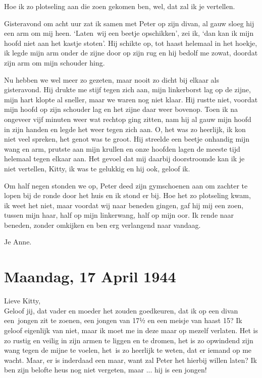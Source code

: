 \documentclass{book}
\begin{document}
Hoe ik zo plotseling aan die zoen gekomen ben, wel, dat zal ik je
vertellen.

Gisteravond om acht uur zat ik samen met Peter op zijn divan, al gauw
sloeg hij een arm om mij heen. `Laten~wij een beetje opschikken', zei
ik, `dan kan ik mijn hoofd niet aan het kastje stoten'. Hij schikte op,
tot haast helemaal in het hoekje, ik legde mijn arm onder de zijne door
op zijn rug en hij bedolf me zowat, doordat zijn arm om mijn schouder
hing.

Nu hebben we wel meer zo gezeten, maar nooit zo dicht bij elkaar als
gisteravond. Hij drukte me stijf tegen zich aan, mijn linkerborst lag op
de zijne, mijn hart klopte al sneller, maar we waren nog niet klaar. Hij
rustte niet, voordat mijn hoofd op zijn schouder lag en het zijne daar
weer bovenop. Toen ik na ongeveer vijf minuten weer wat rechtop ging
zitten, nam hij al gauw mijn hoofd in zijn handen en legde het weer
tegen zich aan. O, het was zo heerlijk, ik kon niet veel spreken, het
genot was te groot. Hij streelde een beetje onhandig mijn wang en arm,
prutste aan mijn krullen en onze hoofden lagen de meeste tijd helemaal
tegen elkaar aan. Het gevoel dat mij daarbij doorstroomde kan ik je niet
vertellen, Kitty, ik was te gelukkig en hij ook, geloof ik.

Om half negen stonden we op, Peter deed zijn gymschoenen aan om zachter
te lopen bij de ronde door het huis en ik stond er bij. Hoe het zo
plotseling kwam, ik weet het niet, maar voordat wij naar beneden gingen,
gaf hij mij een zoen, tussen mijn haar, half op mijn linkerwang, half op
mijn oor. Ik rende naar beneden, zonder omkijken en ben erg verlangend
naar vandaag.

Je Anne.

\chapter{Maandag, 17 April 1944}

Lieve Kitty,\\Geloof jij, dat vader en moeder het zouden goedkeuren, dat
ik op een divan een~jongen zit te zoenen, een jongen van 171⁄2 en een
meisje van haast 15? Ik geloof eigenlijk van niet, maar ik moet me in
deze maar op mezelf verlaten. Het is zo rustig en veilig in zijn armen
te liggen en te dromen, het is zo opwindend zijn wang tegen de mijne te
voelen, het~is zo heerlijk te weten, dat er iemand op me wacht. Maar, er
is inderdaad een maar, want zal Peter het hierbij willen laten? Ik ben
zijn belofte heus nog niet vergeten, maar ... hij is een jongen!
\end{document}
